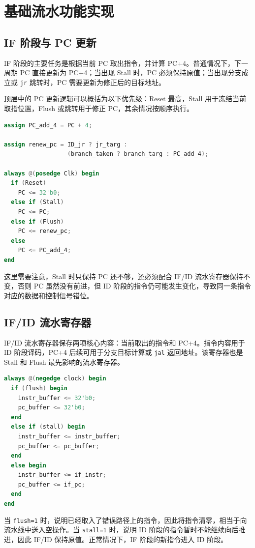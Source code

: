 \documentclass[UTF8,zihao=-4]{ctexart}
\begin{document}
\section{基础流水功能实现}

\subsection{IF 阶段与 PC 更新}

IF 阶段的主要任务是根据当前 PC 取出指令，并计算 PC+4。普通情况下，下一周期 PC 直接更新为 PC+4；当出现 Stall 时，PC 必须保持原值；当出现分支成立或 \texttt{jr} 跳转时，PC 需要更新为修正后的目标地址。

顶层中的 PC 更新逻辑可以概括为以下优先级：Reset 最高，Stall 用于冻结当前取指位置，Flush 或跳转用于修正 PC，其余情况按顺序执行。

\begin{lstlisting}[language=Verilog]
assign PC_add_4 = PC + 4;

assign renew_pc = ID_jr ? jr_targ :
                  (branch_taken ? branch_targ : PC_add_4);

always @(posedge Clk) begin
  if (Reset)
    PC <= 32'b0;
  else if (Stall)
    PC <= PC;
  else if (Flush)
    PC <= renew_pc;
  else
    PC <= PC_add_4;
end
\end{lstlisting}

这里需要注意，Stall 时只保持 PC 还不够，还必须配合 IF/ID 流水寄存器保持不变，否则 PC 虽然没有前进，但 ID 阶段的指令仍可能发生变化，导致同一条指令对应的数据和控制信号错位。

\subsection{IF/ID 流水寄存器}

IF/ID 流水寄存器保存两项核心内容：当前取出的指令和 PC+4。指令内容用于 ID 阶段译码，PC+4 后续可用于分支目标计算或 \texttt{jal} 返回地址。该寄存器也是 Stall 和 Flush 最先影响的流水寄存器。

\begin{lstlisting}[language=Verilog]
always @(negedge clock) begin
  if (flush) begin
    instr_buffer <= 32'b0;
    pc_buffer <= 32'b0;
  end
  else if (stall) begin
    instr_buffer <= instr_buffer;
    pc_buffer <= pc_buffer;
  end
  else begin
    instr_buffer <= if_instr;
    pc_buffer <= if_pc;
  end
end
\end{lstlisting}

当 \texttt{flush=1} 时，说明已经取入了错误路径上的指令，因此将指令清零，相当于向流水线中送入空操作。当 \texttt{stall=1} 时，说明 ID 阶段的指令暂时不能继续向后推进，因此 IF/ID 保持原值。正常情况下，IF 阶段的新指令进入 ID 阶段。
\end{document}
